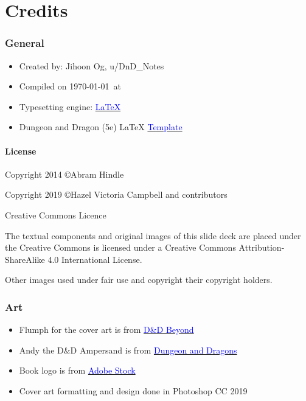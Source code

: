 \documentclass[CMPUT-404-Notes.tex]{subfiles}
\begin{document}
\onecolumn
\chapter*{Credits}
\subsection*{General}
\begin{itemize}
    \item Created by: Jihoon Og, u/DnD\_Notes
    \item Compiled on \today\  at \currenttime
    \item Typesetting engine: \href{https://www.latex-project.org/}{\textcolor{blue}{\LaTeX}}
    \item Dungeon and Dragon (5e) LaTeX \href{https://github.com/rpgtex/DND-5e-LaTeX-Template}{\textcolor{blue}{Template}}
\end{itemize}
\subsubsection{License} 
Copyright 2014 \copyright  Abram Hindle

\noindent
Copyright 2019 \copyright  Hazel Victoria Campbell and contributors

\noindent
Creative Commons Licence

\noindent
The textual components and original images of this slide deck are placed under the Creative Commons is licensed under a Creative Commons Attribution-ShareAlike 4.0 International License.

\noindent
Other images used under fair use and copyright their copyright holders.

\subsection*{Art}
\begin{itemize}
    \item Flumph for the cover art is from \href{https://www.dndbeyond.com/}{\textcolor{blue}{D\&D Beyond}}
    \item Andy the D\&D Ampersand is from \href{https://www.dnd.wizards.com}{\textcolor{blue}{Dungeon and Dragons}} 
    \item Book logo is from \href{https://www.google.com/url?sa=i&url=https%3A%2F%2Fstock.adobe.com%2Fhk%2Fsearch%3Fk%3Dopen%2520book%2520logo&psig=AOvVaw2lUtRbocenjbcgV6X8Ckfk&ust=1637268891098000&source=images&cd=vfe&ved=0CAsQjRxqFwoTCKib14ikoPQCFQAAAAAdAAAAABAD}{\textcolor{blue}{Adobe Stock}}
    \item Cover art formatting and design done in Photoshop CC 2019
\end{itemize}
\end{document}
